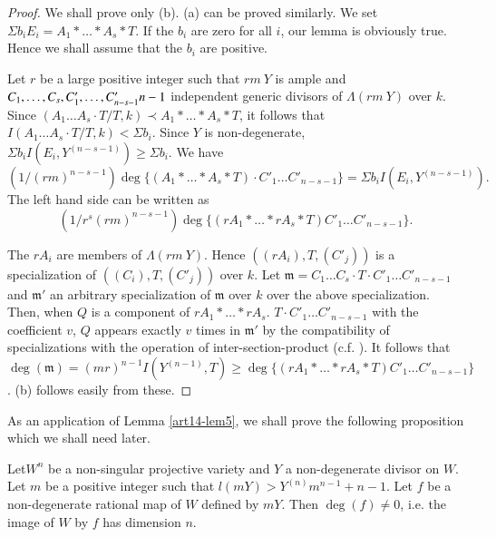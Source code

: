 \begin{proof}
We shall prove only {\rm(b)}. {\rm(a)} can be proved similarly. We set $\Sigma b_{i}E_{i}=A_{1}*\ldots * A_{s}*T$. If the $b_{i}$ are zero for all $i$, our lemma is obviously true. Hence we shall assume that the $b_{i}$ are positive.

Let $r$ be a large positive integer such that $rm\ Y$ is ample and $C_{1},\ldots,\break C_{s},C'_{1},\ldots,C'_{n-s-1}n-1$ independent generic divisors of $\Lambda(rm\ Y)$ over $k$. Since $(A_{1}\ldots A_{s}\cdot T/T, k)\prec A_{1}*\ldots * A_{s} * T$, it follows that $I(A_{1}\ldots A_{s}\cdot T/T,k)<\Sigma b_{i}$. Since $Y$ is non-degenerate, $\Sigma b_{i}I(E_{i},Y^{(n-s-1)})\geq \Sigma b_{i}$. We have
{\fontsize{10pt}{12pt}\selectfont
$$
(1/(rm)^{n-s-1})\deg \{(A_{1}*\ldots * A_{s} * T)\cdot C'_{1}\ldots C'_{n-s-1}\}=\Sigma b_{i}I(E_{i},Y^{(n-s-1)}).
$$}\relax
The left hand side can be written as
$$
(1/r^{s}(rm)^{n-s-1})\deg \{(rA_{1} * \ldots * rA_{s} * T)C'_{1}\ldots C'_{n-s-1}\}.
$$

The $rA_{i}$ are members of $\Lambda(rm\ Y)$. Hence $((rA_{i}), T, (C'_{j}))$ is a specialization of $((C_{i}),T,(C'_{j}))$ over $k$. Let $\mathfrak{m}=C_{1}\ldots C_{s}\cdot T\cdot C'_{1}\ldots C'_{n-s-1}$ and $\mathfrak{m}'$ an arbitrary specialization of $\mathfrak{m}$ over $k$ over the above specialization. Then, when $Q$ is a component of $rA_{1}*\ldots * rA_{s}$. $T\cdot C'_{1}\ldots C'_{n-s-1}$ with the coefficient $v$, $Q$ appears exactly $v$ times in $\mathfrak{m}'$ by the compatibility of specializations with the operation of inter-section-product (c.f. \cite{art14-key24}). It follows that $\deg(\mathfrak{m})=(mr)^{n-1} I(Y^{(n-1)}, T)\geq \deg \{(rA_{1}*\ldots * rA_{s} * T)C'_{1}\ldots C'_{n-s-1}\}$. (b) follows easily from these.
\end{proof}

As an application of Lemma \ref{art14-lem5}, we shall prove the following proposition which we shall need later.

\begin{proposition}\label{art14-prop5}
Let\pageoriginale $W^{n}$ be a non-singular projective variety and $Y$ a non-degenerate divisor on $W$. Let $m$ be a positive integer such that $l(mY)>Y^{(n)}m^{n-1}+n-1$. Let $f$ be a non-degenerate rational map of $W$ defined by $mY$. Then $\deg (f)\neq 0$, i.e. the image of $W$ by $f$ has dimension $n$.
\end{proposition}

